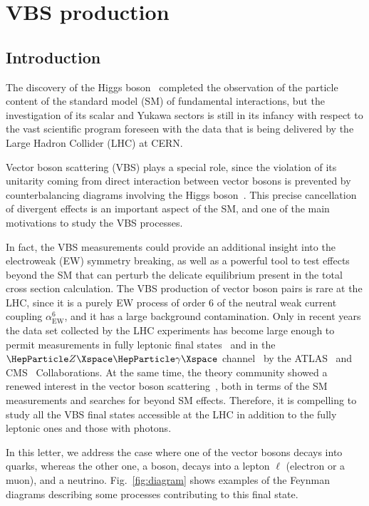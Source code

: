 \chapter{VBS production}
\section{Introduction}\label{section:introduction_VBS}

The discovery of the Higgs boson~\cite{Aad:2012tfa,Chatrchyan:2012ufa} completed the observation of the
particle content of the standard model (SM) of fundamental interactions, but the investigation of its scalar and Yukawa
sectors is still in its infancy with respect to the vast scientific program foreseen with the data that is being
delivered by the Large Hadron Collider (LHC) at CERN.

Vector boson scattering (VBS) plays a special role, since the violation of its unitarity coming from direct interaction
between vector bosons is prevented by counterbalancing diagrams involving the Higgs boson~\cite{Lee:1977eg}.  This
precise cancellation of divergent effects is an important aspect of the SM, and one of the main motivations to study the
VBS processes.

In fact, the VBS measurements could provide an additional insight into the electroweak (EW) symmetry breaking, as well as
a powerful tool to test effects beyond the SM that can perturb the delicate equilibrium present in the total cross
section calculation.  The VBS production of vector boson pairs is rare at the LHC, since it is a purely EW process of
order 6 of the neutral weak current coupling $\alpha_{\mathrm{EW}}^6$, and it has a large background contamination.
Only in recent years the data set collected by the LHC experiments has become large enough to permit measurements in
fully leptonic final states~\cite{Sirunyan:2017ret, Aaboud:2019nmv,Sirunyan:2019ksz, Aaboud:2018ddq, ATLAS:2020nlt,
Sirunyan:2017fvv} and in the $\PZ\PGg$ channel~\cite{CMS:2021gme,ATLAS:2019qhm} by the ATLAS~\cite{ATLAS:2008xda} and
CMS~\cite{Chatrchyan:2008zzk} Collaborations.  At the same time, the theory community showed a renewed interest in the
vector boson scattering~\cite{Alessandro:2018khj}, both in terms of the SM measurements and searches for beyond SM
effects.  Therefore, it is compelling to study all the VBS final states accessible at the LHC in addition to the fully
leptonic ones and those with photons.

In this letter, we address the case where one of the vector bosons decays into quarks, whereas the other one, a {\PW}
boson, decays into a lepton $\ell$ (electron or a muon), and a neutrino.  Fig.~\ref{fig:diagram} shows examples of the
Feynman diagrams describing some processes contributing to this final state.

